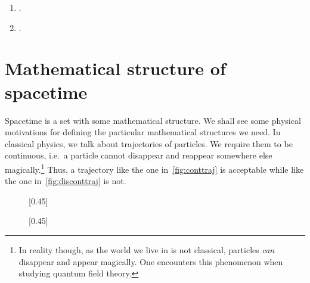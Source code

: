 \documentclass[a4 paper, 11pt]{book}
\theoremstyle{definition}
\begin{document}
    \begin{enumerate}
        \item {}.
        \item {}.
    \end{enumerate}

    \section{Mathematical structure of spacetime}

    Spacetime is a set with some mathematical structure. We shall see some physical motivations for defining the particular mathematical structures we need. In classical physics, we talk about trajectories of particles. We require them to be continuous, i.e.\ a particle cannot disappear and reappear somewhere else magically.\footnote{In reality though, as the world we live in is not classical, particles \textit{can} disappear and appear magically. One encounters this phenomenon when studying quantum field theory.} Thus, a trajectory like the one in~\cref{fig:conttraj} is acceptable while like the one in~\cref{fig:disconttraj} is not.

    \begin{figure}[htb]
        \centering
        [0.45\textwidth]
        {
        }
        \hfill
        [0.45\textwidth]
        {
        }
        \label{fig:traj}
    \end{figure}
\end{document}
